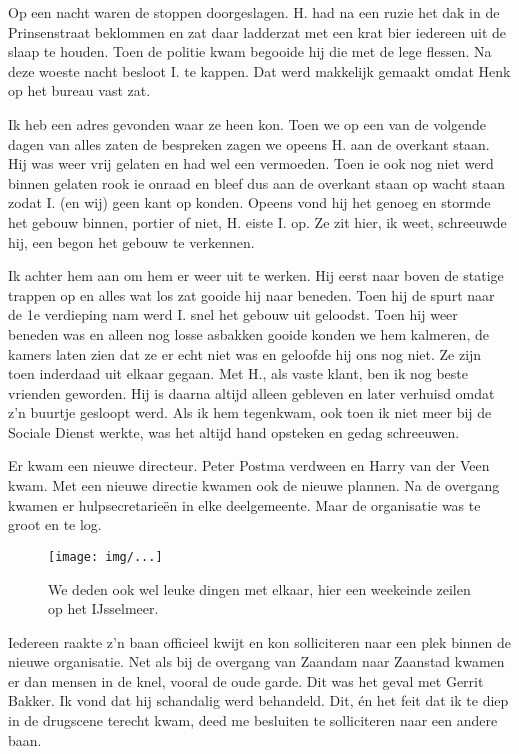 \documentclass[10pt,twoside,openright]{memoir}
\begin{document}
Op een nacht waren de stoppen doorgeslagen. H. had na een ruzie het dak in de Prinsenstraat beklommen en zat daar ladderzat met een krat bier iedereen uit de slaap te houden. Toen de politie kwam begooide hij die met de lege flessen. Na deze woeste nacht besloot I. te kappen. Dat werd makkelijk gemaakt omdat Henk op het bureau vast zat. 

Ik heb een adres gevonden waar ze heen kon. Toen we op een van de volgende dagen van alles zaten de bespreken zagen we opeens H. aan de overkant staan. Hij was weer vrij gelaten en had wel een vermoeden. Toen ie ook nog niet werd binnen gelaten rook ie onraad en bleef dus aan de overkant staan op wacht staan zodat I. (en wij) geen kant op konden. Opeens vond hij het genoeg en stormde het gebouw binnen, portier of niet, H. eiste I. op. Ze zit hier, ik weet, schreeuwde hij, een begon het gebouw te verkennen. 

Ik achter hem aan om hem er weer uit te werken. Hij eerst naar boven de statige trappen op en alles wat los zat gooide hij naar beneden. Toen hij de spurt naar de 1e verdieping nam werd I. snel het gebouw uit geloodst. Toen hij weer beneden was en alleen nog losse asbakken gooide konden we hem kalmeren, de kamers laten zien dat ze er echt niet was en geloofde hij ons nog niet. Ze zijn toen inderdaad uit elkaar gegaan. Met H., als vaste klant, ben ik nog beste vrienden geworden. Hij is daarna altijd alleen gebleven en later verhuisd omdat z’n buurtje gesloopt werd. Als ik hem tegenkwam, ook toen ik niet meer bij de Sociale Dienst werkte, was het altijd hand opsteken en gedag schreeuwen.

Er kwam een nieuwe directeur. Peter Postma verdween en Harry van der Veen kwam. Met een nieuwe directie kwamen ook de nieuwe plannen. Na de overgang kwamen er hulpsecretarieën in elke deelgemeente. Maar de organisatie was te groot en te log. 

\begin{figure}[t]
\texttt{[image: img/...]}
\caption{We deden ook wel leuke dingen met elkaar, hier een weekeinde zeilen op het IJsselmeer.}
\end{figure}

Iedereen raakte z’n baan officieel kwijt en kon solliciteren naar een plek binnen de nieuwe organisatie. Net als bij de overgang van Zaandam naar Zaanstad kwamen er dan mensen in de knel, vooral de oude garde. Dit was het geval met Gerrit Bakker. Ik vond dat hij schandalig werd behandeld. Dit, én het feit dat ik te diep in de drugscene terecht kwam, deed me besluiten te solliciteren naar een andere baan. 
\end{document}
